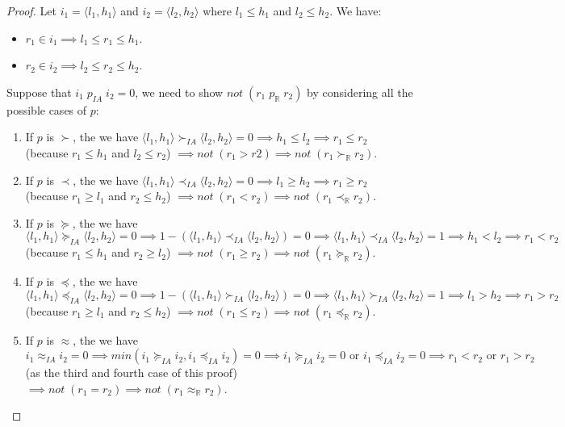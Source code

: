 \begin{proof}
Let $i_1 = \langle l_1, h_1\rangle $ and $i_2 = \langle l_2, h_2\rangle $ where $l_1 \le h_1$ and $l_2 \le h_2$. We have: 
\begin{itemize}
\item $r_1 \in i_1 \implies l_1 \le r_1 \le h_1$. 
\item $r_2 \in i_2 \implies l_2 \le r_2 \le h_2$. 
\end{itemize}
Suppose  that $i_1 \; p_{IA} \; i_2 = 0 $, we need to show $not \; (r_1 \; p_\mathbb{R} \; r_2)$ by considering all the possible cases of $p$:
\begin{enumerate}
\item If $p$ is $\succ$, the we have $\langle l_1, h_1\rangle  \succ_{IA} \langle l_2, h_2\rangle  = 0  \implies h_1 \le l_2 \implies r_1 \le r_2$ (because $r_1 \le h_1$ and $l_2 \le r_2$) $\implies not \; (r_1 > r2) \implies not \; (r_1 \succ_\mathbb{R} r_2)$.
\item If $p$ is $\prec$, the we have $\langle l_1, h_1\rangle  \prec_{IA} \langle l_2, h_2\rangle  = 0  \implies l_1 \ge h_2 \implies r_1 \ge r_2$ (because $r_1 \ge l_1$ and $r_2 \le h_2$) $\implies not \; (r_1 < r_2) \implies not \; (r_1 \prec_\mathbb{R} r_2)$.
\item If $p$ is $\succeq$, the we have $\langle l_1, h_1\rangle  \succeq_{IA} \langle l_2, h_2\rangle  = 0  \implies {1 -  (\langle l_1, h_1\rangle  \prec_{IA} \langle l_2, h_2\rangle ) = 0}  \implies \langle l_1, h_1\rangle  \prec_{IA} \langle l_2, h_2\rangle  = 1 \implies h_1 < l_2 \implies r_1 < r_2$ (because $r_1 \le h_1$ and $r_2 \ge l_2$) $\implies not \; (r_1 \ge r_2) \implies not \; (r_1 \succeq_\mathbb{R} r_2)$.
\item If $p$ is $\preceq$, the we have $\langle l_1, h_1\rangle  \preceq_{IA} \langle l_2, h_2\rangle  = 0  \implies {1 - (\langle l_1, h_1\rangle  \succ_{IA} \langle l_2, h_2\rangle ) = 0}  \implies \langle l_1, h_1\rangle  \succ_{IA} \langle l_2, h_2\rangle  = 1 \implies l_1 > h	_2 \implies r_1 > r_2$ (because $r_1 \ge l_1$ and $r_2 \le h_2$) $\implies not \; (r_1 \le r_2) \implies not \; (r_1 \preceq_\mathbb{R} r_2)$.
\item If $p$ is $\approx$, the we have $i_1 \approx_{IA} i_2 = 0  \implies min(i_1 \succeq_{IA} i_2 , i_1 \preceq_{IA} i_2) = 0  \implies {i_1 \succeq_{IA} i_2 = 0}  \text{ or } i_1 \preceq_{IA} i_2 = 0  \implies r_1 < r_2 \text{ or } r_1 > r_2$ (as the third and fourth case of this proof) $\implies not \; (r_1 = r_2) \implies not \; (r_1 \approx_\mathbb{R} r_2)$.

\end{enumerate}
\end{proof}
